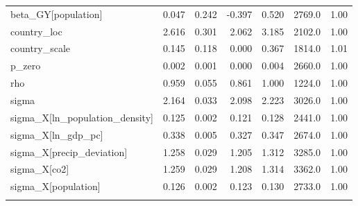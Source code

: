 \begin{table}[H]
{\begin{tabular}{lrrrrrr}
beta\_GY[population] & 0.047 & 0.242 & -0.397 & 0.520 & 2769.0 & 1.00 \\
country\_loc & 2.616 & 0.301 & 2.062 & 3.185 & 2102.0 & 1.00 \\
country\_scale & 0.145 & 0.118 & 0.000 & 0.367 & 1814.0 & 1.01 \\
p\_zero & 0.002 & 0.001 & 0.000 & 0.004 & 2660.0 & 1.00 \\
rho & 0.959 & 0.055 & 0.861 & 1.000 & 1224.0 & 1.00 \\
sigma & 2.164 & 0.033 & 2.098 & 2.223 & 3026.0 & 1.00 \\
sigma\_X[ln\_population\_density] & 0.125 & 0.002 & 0.121 & 0.128 & 2441.0 & 1.00 \\
sigma\_X[ln\_gdp\_pc] & 0.338 & 0.005 & 0.327 & 0.347 & 2674.0 & 1.00 \\
sigma\_X[precip\_deviation] & 1.258 & 0.029 & 1.205 & 1.312 & 3285.0 & 1.00 \\
sigma\_X[co2] & 1.259 & 0.029 & 1.208 & 1.314 & 3362.0 & 1.00 \\
sigma\_X[population] & 0.126 & 0.002 & 0.123 & 0.130 & 2733.0 & 1.00 \\
\botrule
\end{tabular}}
\end{table}
